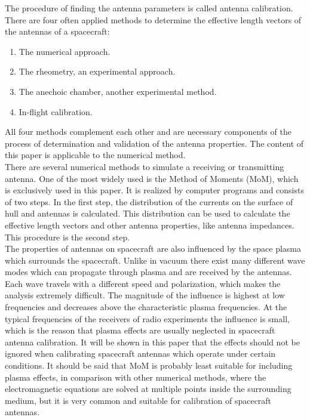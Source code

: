 \documentclass[a4paper,11pt]{article}
\begin{document}
The procedure of finding the antenna parameters is called antenna calibration. There are four often applied methods to determine the effective length vectors of the antennas of a spacecraft:

\begin{enumerate}
\item The numerical approach.
\item The rheometry, an experimental approach.
\item The anechoic chamber, another experimental method.
\item In-flight calibration.
\end{enumerate}

All four methods complement each other and are necessary components of the process of determination and validation of the antenna properties. The content of this paper is applicable to the numerical method.\\

There are several numerical methods to simulate a receiving or transmitting antenna. One of the most widely used is the Method of Moments
(MoM), which is exclusively used in this paper. It is realized by computer programs and consists of two steps. In the first step, the distribution of the currents on the surface of hull and antennas is calculated. This distribution can be used to calculate the effective length vectors and other antenna properties, like antenna impedances. This procedure is the second step.\\

The properties of antennas on spacecraft are also influenced by the space plasma which surrounds the spacecraft. Unlike in vacuum there exist many different wave modes which can propagate through plasma and are received by the antennas. Each wave travels with a different speed and polarization, which makes the analysis extremely difficult. The magnitude of the influence is highest at low frequencies and decreases above the characteristic plasma frequencies. At the typical frequencies of the receivers of radio experiments the influence is small, which is the reason that plasma effects are usually neglected in spacecraft antenna calibration. It will be shown in this paper that the effects should not be ignored when calibrating spacecraft antennas which operate under certain conditions. It should be said that MoM is probably least suitable for including plasma effects, in comparison with other numerical methods, where the electromagnetic equations are solved at multiple points inside the surrounding medium, but it is very common and suitable for calibration of spacecraft antennas.\\
\end{document}
